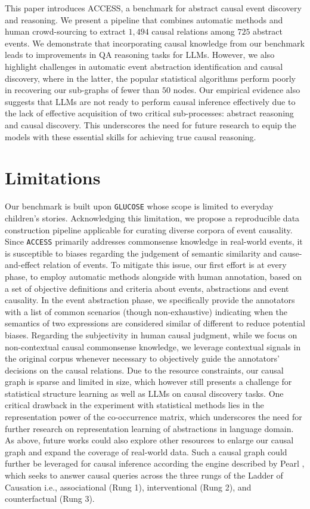 This paper introduces ACCESS, a benchmark for abstract causal event discovery and reasoning. We present a pipeline that combines automatic methods and human crowd-sourcing to extract $1,494$ causal relations among $725$ abstract events. We demonstrate that incorporating causal knowledge from our benchmark leads to improvements in QA reasoning tasks for LLMs. However, we also highlight challenges in automatic event abstraction identification and causal discovery, where in the latter, the popular statistical algorithms perform poorly in recovering our sub-graphs of fewer than $50$ nodes.  Our empirical evidence also suggests that LLMs are not ready to perform causal inference effectively due to the lack of effective acquisition of two critical sub-processes: abstract reasoning and causal discovery. This underscores the need for future research to equip the models with these essential skills for achieving true causal reasoning.

\section*{Limitations}
Our benchmark is built upon \texttt{GLUCOSE} \citep{mostafazadeh-etal-2020-glucose} whose scope is limited to everyday children's stories. Acknowledging this limitation, we propose a reproducible data construction pipeline applicable for curating diverse corpora of event causality.  Since \texttt{ACCESS} primarily addresses commonsense knowledge in real-world events, it is susceptible to biases regarding the judgement of semantic similarity and cause-and-effect relation of events. To mitigate this issue, our first effort is at every phase, to employ automatic methods alongside with human annotation, based on a set of objective definitions and criteria about events, abstractions and event causality. In the event abstraction phase, we specifically provide the annotators with a list of common scenarios (though non-exhaustive) indicating when the semantics of two expressions are considered similar of different to reduce potential biases.  Regarding the subjectivity in human causal judgment, while we focus on non-contextual causal commonsense knowledge, we leverage contextual signals in the original corpus whenever necessary to objectively guide the annotators' decisions on the causal relations. Due to the resource constraints, our causal graph is sparse and limited in size, which however still presents a challenge for statistical structure learning as well as LLMs on causal discovery tasks. One critical drawback in the experiment with statistical methods lies in the representation power of the co-occurrence matrix, which underscores the need for further research on representation learning of abstractions in language domain. As above, future works could also explore other resources to enlarge our causal graph and expand the coverage of real-world data. Such a causal graph could further be leveraged for causal inference according the engine described by Pearl \citep{pearl2009causality}, which seeks to answer causal queries across the three rungs of the Ladder of Causation i.e., associational (Rung 1), interventional (Rung 2), and counterfactual (Rung 3).

